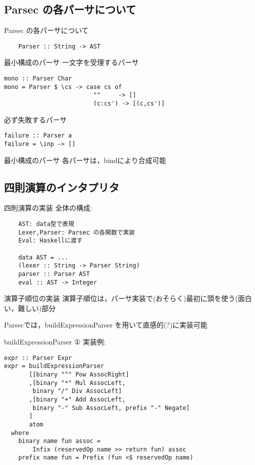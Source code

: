 \documentclass[uplatex,dvipdfmx,ja=standard]{beamer}
\begin{document}
\subsection{Parsec の各パーサについて}

\begin{frame}[fragile]{Parsec の各パーサについて}
    \begin{verbatim}
    Parser :: String -> AST
    \end{verbatim}
\end{frame}


\begin{frame}[fragile]{最小構成のパーサ}
一文字を受理するパーサ
    \begin{verbatim}
mono :: Parser Char
mono = Parser $ \cs -> case cs of
                         ""     -> []
                         (c:cs') -> [(c,cs')]
    \end{verbatim}
必ず失敗するパーサ
    \begin{verbatim}
failure :: Parser a
failure = \inp -> []
    \end{verbatim}
\end{frame}


\begin{frame}{最小構成のパーサ}
    各パーサは，bindにより合成可能

\end{frame}

\subsection{四則演算のインタプリタ}

\begin{frame}[fragile]{四則演算の実装}
    全体の構成:
    \begin{verbatim}
    AST: data型で表現
    Lexer,Parser: Parsec の各関数で実装
    Eval: Haskellに渡す

    data AST = ...
    (lexer :: String -> Parser String)
    parser :: Parser AST
    eval :: AST -> Integer
    \end{verbatim}
\end{frame}

\begin{frame}[fragile]{演算子順位の実装}
    演算子順位は，パーサ実装で(おそらく)最初に頭を使う(面白い，難しい)部分

    Parsecでは，buildExpressionParser を用いて直感的(?)に実装可能
\end{frame}

\begin{frame}[fragile]{buildExpressionParser ①}
    実装例:
    \begin{verbatim}
expr :: Parser Expr
expr = buildExpressionParser
       [[binary "^" Pow AssocRight]
       ,[binary "*" Mul AssocLeft, 
        binary "/" Div AssocLeft]
       ,[binary "+" Add AssocLeft, 
        binary "-" Sub AssocLeft, prefix "-" Negate]
       ]
       atom
  where
    binary name fun assoc = 
        Infix (reservedOp name >> return fun) assoc
    prefix name fun = Prefix (fun <$ reservedOp name)
    \end{verbatim}

\end{frame}
\end{document}
